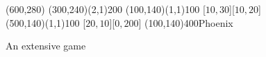 \documentclass{article}
\begin{document}
\pagestyle{empty}
\begin{figure}[htb]
\hspace*{\fill}
\begin{egame}(600,280)
\putbranch(300,240)(2,1){200}
\putbranch(100,140)(1,1){100}
[$10,30$][$10,20$]
\putbranch(500,140)(1,1){100}
[$20,10$][$0,200$]
\infoset(100,140){400}{Phoenix}
\end{egame}
\hspace*{\fill}
\caption[]{An extensive game}\label{f:one}
\end{figure}
\end{document}
